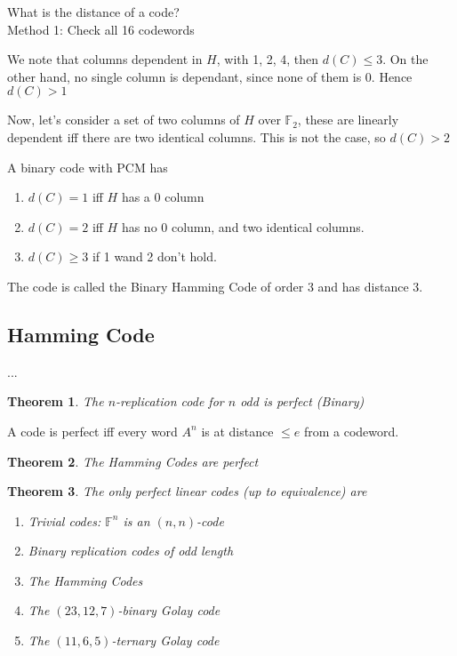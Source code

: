 \documentclass{article}
\newtheorem{thm}{Theorem}
\begin{document}
What is the distance of a code?\\
Method 1: Check all 16 codewords

We note that columns dependent in $H$, with 1, 2, 4, then $d(C)  \leq 3$. On the other
hand, no single column is dependant, since none of them is 0. Hence $d(C) > 1$

Now, let's consider a set of two columns of $H$ over $\mathbb{F}_2$, these are linearly
dependent iff there are two identical columns. This is not the case, so $d(C) > 2$

\begin{lemma}
    A binary code with PCM has
    \begin{enumerate}
        \item $d(C) = 1$ iff $H$ has a 0 column
        \item $d(C) = 2$ iff $H$ has no 0 column, and two identical columns.
        \item $d(C) \geq 3$ if 1 wand 2 don't hold.
    \end{enumerate}
\end{lemma}

The code is called the Binary Hamming Code of order 3 and has distance 3.

\subsection{Hamming Code}
...
\begin{thm}
    The $n$-replication code for $n$ odd is perfect (Binary)
\end{thm}

\begin{lemma}
    A code is perfect iff every word $A^n$ is at distance $\leq e$
    from a codeword.
\end{lemma}

\begin{thm}
    The Hamming Codes are perfect
\end{thm}

\begin{thm}
    The only perfect linear codes (up to equivalence) are
    \begin{enumerate}
        \item Trivial codes: $\mathbb{F}^n$ is an $(n,n)$-code
        \item Binary replication codes of odd length
        \item The Hamming Codes
        \item The $(23, 12, 7)$-binary Golay code
        \item The $(11,6,5)$-ternary Golay code
    \end{enumerate}
\end{thm}
\end{document}
